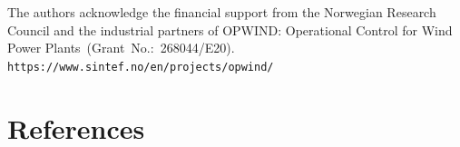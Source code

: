 \documentclass[a4paper]{jpconf}
\begin{document}
\clearpage
\ack

The authors acknowledge the financial support from the Norwegian
Research Council and the industrial partners of OPWIND: Operational
Control for Wind Power Plants~(Grant~No.:~268044/E20).
\texttt{https://www.sintef.no/en/projects/opwind/}

\section*{References}



\end{document}
